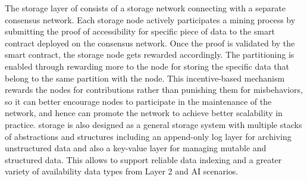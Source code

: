 The storage layer of \projabbrev consists of a storage network connecting with a separate consensus network. Each storage node actively participates a mining process by submitting the proof of accessibility for specific piece of data to the smart contract deployed on the consensus network. Once the proof is validated by the smart contract, the storage node gets rewarded accordingly. The partitioning is enabled through rewarding more to the node for storing the specific data that belong to the same partition with the node. This incentive-based mechanism rewards the nodes for contributions rather than punishing them for misbehaviors, so it can better encourage nodes to participate in the maintenance of the network, and hence can promote the network to achieve better scalability in practice. \projabbrev storage is also designed as a general storage system with multiple stacks of abstractions and structures including an append-only log layer for archiving unstructured data and also a key-value layer for managing mutable and structured data. This allows \projabbrev to support reliable data indexing and a greater variety of availability data types from Layer 2 and AI scenarios.  




 


